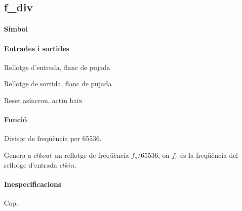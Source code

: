 \subsection{\label{sub:\projectname-f_div} \textsf{f\_div}}

\paragraph{Símbol}

\begin{center}  \end{center}

\paragraph{Entrades i sortides}

\begin{where}
\item[\nodenamebit{clkin}] Rellotge d'entrada, flanc de pujada
\item[\nodenamebit{clkout}] Rellotge de sortida, flanc de pujada
\item[\nodenamebit{nrst}] Reset asíncron, actiu baix
\end{where}

\paragraph{Funció}

Divisor de freqüència per 65536.

Genera a $clkout$ un rellotge de freqüència $f_s / 65536$, on $f_s$
és la freqüència del rellotge d'entrada $clkin$.

\paragraph{Inespecificacions}

Cap.

\vspace{1cm}
